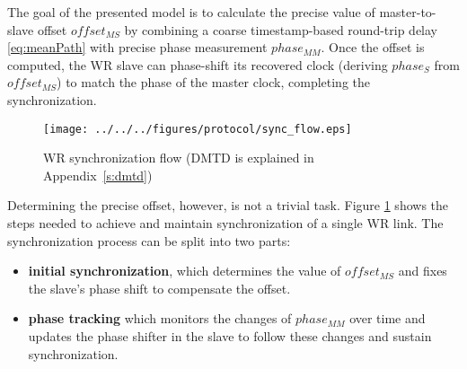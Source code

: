 The goal of the presented model is to calculate the precise value of
master-to-slave offset $offset_{MS}$ by combining a coarse timestamp-based
round-trip delay \eqref{eq:meanPath} with precise phase measurement
$phase_{MM}.$ Once the offset is computed, the WR slave can phase-shift its
recovered clock (deriving $phase_{S}$ from $offset_{MS}$) to match the phase
of the master clock, completing the synchronization.
\begin{figure}[ht!]
  \centering
  \texttt{[image: ../../../figures/protocol/sync\_flow.eps]}
  \caption{WR synchronization flow (DMTD is explained in Appendix~\ref{s:dmtd})}
  \label{fig:sync_flow}
\end{figure}
Determining the precise offset, however, is not a trivial task. Figure
\ref{fig:sync_flow} shows the steps needed to achieve and maintain
synchronization of a single WR link. The synchronization process can be
split into two parts: \begin{itemize}
\item \textbf{initial synchronization}, which determines the value of
$offset_{MS}$ and fixes the slave's phase shift to compensate the offset.
\item \textbf{phase tracking} which monitors the changes of $phase_{MM}$
over time and updates the phase shifter in the slave to follow these changes
and sustain synchronization.
\end{itemize}

\newpage

